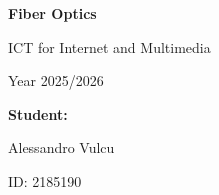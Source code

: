 \begin{titlepage}
    \raggedright
    \vspace*{1cm} %

    {\Huge\bfseries Fiber Optics}\par %
    \vspace{0.5cm}
    {\LARGE ICT for Internet and Multimedia}\par %
    \vspace{0.2cm}
    {\large Year 2025/2026}\par %

    \vfill %

    \begin{flushright}
        {\Large \textbf{Student:}}\par
        {\Large Alessandro Vulcu}\par
        {\large ID: 2185190}\par
    \end{flushright}

    \vspace{2cm} %


\end{titlepage}
